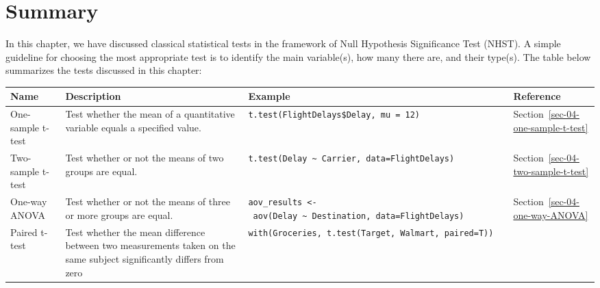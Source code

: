 \documentclass[
  letterpaper,
  DIV=11,
  numbers=noendperiod]{scrreprt}
\begin{document}
\section{Summary}\label{summary-2}

In this chapter, we have discussed classical statistical tests in the
framework of Null Hypothesis Significance Test (NHST). A simple
guideline for choosing the most appropriate test is to identify the main
variable(s), how many there are, and their type(s). The table below
summarizes the tests discussed in this chapter:

\begin{longtable}[]{@{}
  >{\raggedright\arraybackslash}p{}
  >{\raggedright\arraybackslash}p{}
  >{\raggedright\arraybackslash}p{}
  >{\raggedright\arraybackslash}p{}@{}}
\toprule\noalign{}
\begin{minipage}[b]{\linewidth}\raggedright
Name
\end{minipage} & \begin{minipage}[b]{\linewidth}\raggedright
Description
\end{minipage} & \begin{minipage}[b]{\linewidth}\raggedright
Example
\end{minipage} & \begin{minipage}[b]{\linewidth}\raggedright
Reference
\end{minipage} \\
\midrule\noalign{}
\endhead
\bottomrule\noalign{}
\endlastfoot
One-sample t-test & Test whether the mean of a quantitative variable
equals a specified value. &
\texttt{t.test(FlightDelays\$Delay,\ mu\ =\ 12)} &
Section~\ref{sec-04-one-sample-t-test} \\
Two-sample t-test & Test whether or not the means of two groups are
equal. &
\texttt{t.test(Delay\ \textasciitilde{}\ Carrier,\ data=FlightDelays)} &
Section~\ref{sec-04-two-sample-t-test} \\
One-way ANOVA & Test whether or not the means of three or more groups
are equal. &
\texttt{aov\_results\ \textless{}-\ aov(Delay\ \textasciitilde{}\ Destination,\ data=FlightDelays)}
& Section~\ref{sec-04-one-way-ANOVA} \\
Paired t-test & Test whether the mean difference between two
measurements taken on the same subject significantly differs from zero &
\texttt{with(Groceries,\ t.test(Target,\ Walmart,\ paired=T))} &

\end{longtable}
\end{document}
